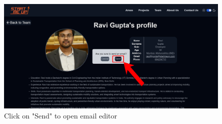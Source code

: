 \documentclass[11pt, letterpaper]{article}
\begin{document}
\begin{figure}[H]
    \centering
    \includegraphics[width=16cm]{images/Scenarios/Scenario3/Screen10.png}
    \caption{Click on "Send" to open email editor}
    \label{fig:scenario3_10}
\end{figure}
\end{document}
